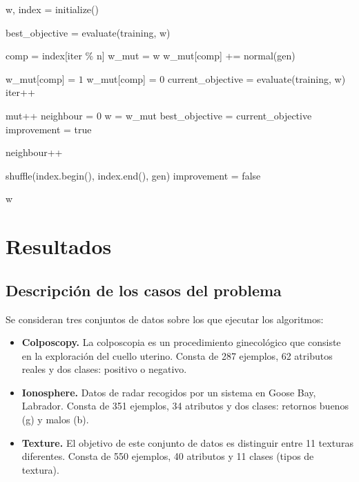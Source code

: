 \documentclass[12pt]{article}
\begin{document}
\begin{algorithm}[h!]
\begin{algorithmic}


\State w, index = initialize()

\State best\_objective = evaluate(training, w)

    \State comp = index[iter $\%$ n]
    \State w\_mut = w
    \State w\_mut[comp] += normal(gen)
    
     \State w\_mut[comp] = $1$
     \State w\_mut[comp] = $0$
    \EndIf
    \State current\_objective = evaluate(training, w)
    \State iter++

      \State mut++
      \State neighbour = $0$
      \State w = w\_mut
      \State best\_objective = current\_objective
      \State improvement = true

    \Else 
      \State neighbour++
    \EndIf

      \State shuffle(index.begin(), index.end(), gen)
      \State improvement = false
    \EndIf
      
\hspace{-.7em} \Return w
\EndFunction

\end{algorithmic}
\end{algorithm}

\newpage
\section{Resultados}

\subsection*{Descripción de los casos del problema}
\label{casos}

Se consideran tres conjuntos de datos sobre los que ejecutar los algoritmos:

\begin{itemize}
	\item \textbf{Colposcopy.} La colposcopia es un procedimiento ginecológico que
consiste en la exploración del cuello uterino. Consta de 287 ejemplos, 62 atributos reales y dos clases: positivo o negativo.
    \item \textbf{Ionosphere.} Datos de radar recogidos por un sistema en Goose Bay, Labrador. Consta de 351 ejemplos, 34 atributos y dos clases: retornos buenos (g) y malos (b).
    \item \textbf{Texture.} El objetivo de este conjunto de datos es distinguir entre 11
texturas diferentes. Consta de 550 ejemplos, 40 atributos y 11 clases (tipos de textura).
\end{itemize}
\end{document}
